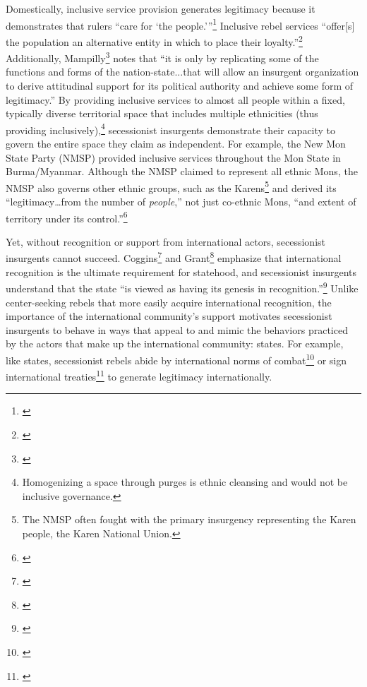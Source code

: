 \documentclass[12pt, letterpaper]{article}
\begin{document}
Domestically, inclusive service provision generates legitimacy because it demonstrates that rulers ``care for `the people.'''\footnote{\citealt[117]{wimmer2012waves}} Inclusive rebel services ``offer[s] the population an alternative entity in which to place their loyalty.''\footnote{\citealt[353]{grynkewich2008welfare}} Additionally, Mampilly\footnote{\citealt[8]{mampilly2011rebel}} notes that ``it is only by replicating some of the functions and forms of the nation-state...that will allow an insurgent organization to derive attitudinal support for its political authority and achieve some form of legitimacy.'' By providing inclusive services to almost all people within a fixed, typically diverse territorial space that includes multiple ethnicities (thus providing inclusively),\footnote{Homogenizing a space through purges is ethnic cleansing and would not be inclusive governance.} secessionist insurgents demonstrate their capacity to govern the entire space they claim as independent. For example, the New Mon State Party (NMSP) provided inclusive services throughout the Mon State in Burma/Myanmar. Although the NMSP claimed to represent all ethnic Mons, the NMSP also governs other ethnic groups, such as the Karens\footnote{The NMSP often fought with the primary insurgency representing the Karen people, the Karen National Union.} and derived its ``legitimacy\ldots from the number of \textit{people},'' not just co-ethnic Mons, ``and extent of territory under its control.''\footnote{\citealt[23; emphasis added]{south2013mon}}

Yet, without recognition or support from international actors, secessionist insurgents cannot succeed. Coggins\footnote{\citealt[29 and 31]{coggins2014power}} and Grant\footnote{\citealt[2]{grant1999recognition}} emphasize that international recognition is the ultimate requirement for statehood, and secessionist insurgents understand that the state ``is viewed as having its genesis in recognition.''\footnote{\citealt[28-9]{coggins2014power}} Unlike center-seeking rebels that more easily acquire international recognition, the importance of the international community's support motivates secessionist insurgents to behave in ways that appeal to and mimic the behaviors practiced by the actors that make up the international community: states. For example, like states, secessionist rebels abide by international norms of combat\footnote{\citealt{lasley2014secession, fazal2013secessionism}} or sign international treaties\footnote{\citealt{jo2015compliant}} to generate legitimacy internationally. 
\end{document}
